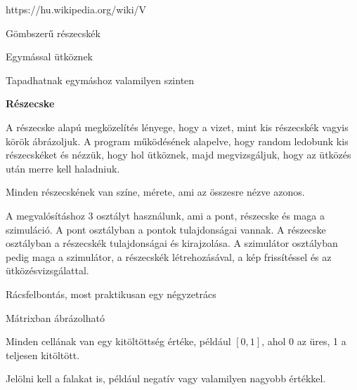 https://hu.wikipedia.org/wiki/V%




Gömbszerű részecskék

Egymással ütköznek

Tapadhatnak egymáshoz valamilyen szinten

\textbf{Részecske}

A részecske alapú megközelítés lényege, hogy a vizet, mint kis részecskék vagyis körök ábrázoljuk. A program működésének alapelve, hogy random ledobunk kis részecskéket és nézzük, hogy hol ütköznek, majd megvizsgáljuk, hogy az ütközés után merre kell haladniuk. 

Minden részecskének van színe, mérete, ami az összesre nézve azonos. 

A megvalósításhoz 3 osztályt használunk, ami a pont, részecske és maga a szimuláció. A pont osztályban a pontok tulajdonságai vannak. A részecske osztályban  a részecskék tulajdonságai és kirajzolása. A szimulátor osztályban pedig maga a szimulátor, a részecskék létrehozásával, a kép frissítéssel és az ütközésvizsgálattal. 


Rácsfelbontás, most praktikusan egy négyzetrács

Mátrixban ábrázolható

Minden cellának van egy kitöltöttség értéke, például $[0, 1]$, ahol 0 az üres, 1 a teljesen kitöltött.

Jelölni kell a falakat is, például negatív vagy valamilyen nagyobb értékkel.
